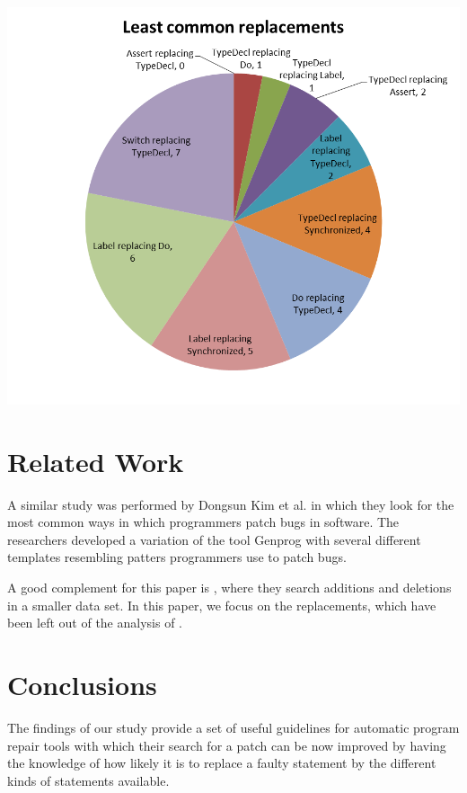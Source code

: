\documentclass{sig-alternate-05-2015}
\begin{document}
\includegraphics[scale=0.5]{g2.png}

\section{Related Work}
A similar study was performed by Dongsun Kim et al. \cite{dongsun} in which they look for the most common ways in which programmers patch bugs in software. The researchers developed a variation of the tool Genprog \cite{weimer}\cite{claire} with several different templates resembling patters programmers use to patch bugs. 

A good complement for this paper is \cite{hao}, where they search additions and deletions in a smaller data set. In this paper, we focus on the replacements, which have been left out of the analysis of \cite{hao}. 



\section{Conclusions}
The findings of our study provide a set of useful guidelines for automatic program repair tools with which their search for a patch can be now improved by having the knowledge of how likely it is to replace a faulty statement by the different kinds of statements available.


\end{document}
